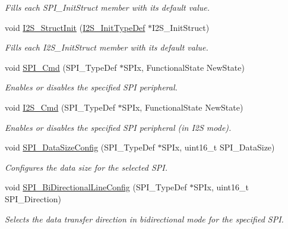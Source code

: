 \begin{DoxyCompactItemize}
\begin{DoxyCompactList}\small\item\em Fills each S\-P\-I\-\_\-\-Init\-Struct member with its default value. \end{DoxyCompactList}\item 
void \hyperlink{group___s_p_i___group1_ga7470ec1d0759fdeeb42c7fe71a3b41b7}{I2\-S\-\_\-\-Struct\-Init} (\hyperlink{struct_i2_s___init_type_def}{I2\-S\-\_\-\-Init\-Type\-Def} $\ast$I2\-S\-\_\-\-Init\-Struct)
\begin{DoxyCompactList}\small\item\em Fills each I2\-S\-\_\-\-Init\-Struct member with its default value. \end{DoxyCompactList}\item 
void \hyperlink{group___s_p_i___group1_gaa31357879a65ee1ed7223f3b9114dcf3}{S\-P\-I\-\_\-\-Cmd} (S\-P\-I\-\_\-\-Type\-Def $\ast$S\-P\-Ix, Functional\-State New\-State)
\begin{DoxyCompactList}\small\item\em Enables or disables the specified S\-P\-I peripheral. \end{DoxyCompactList}\item 
void \hyperlink{group___s_p_i___group1_gafe061c71bbc5b4224f3f2884dc53739e}{I2\-S\-\_\-\-Cmd} (S\-P\-I\-\_\-\-Type\-Def $\ast$S\-P\-Ix, Functional\-State New\-State)
\begin{DoxyCompactList}\small\item\em Enables or disables the specified S\-P\-I peripheral (in I2\-S mode). \end{DoxyCompactList}\item 
void \hyperlink{group___s_p_i___group1_gafc82e90841d7879535d655c035709cb1}{S\-P\-I\-\_\-\-Data\-Size\-Config} (S\-P\-I\-\_\-\-Type\-Def $\ast$S\-P\-Ix, uint16\-\_\-t S\-P\-I\-\_\-\-Data\-Size)
\begin{DoxyCompactList}\small\item\em Configures the data size for the selected S\-P\-I. \end{DoxyCompactList}\item 
void \hyperlink{group___s_p_i___group1_ga166171c421fc51da7714723524d41b45}{S\-P\-I\-\_\-\-Bi\-Directional\-Line\-Config} (S\-P\-I\-\_\-\-Type\-Def $\ast$S\-P\-Ix, uint16\-\_\-t S\-P\-I\-\_\-\-Direction)
\begin{DoxyCompactList}\small\item\em Selects the data transfer direction in bidirectional mode for the specified S\-P\-I. \end{DoxyCompactList}\item 

\end{DoxyCompactItemize}
